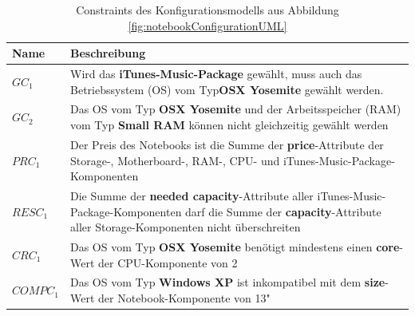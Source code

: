 \documentclass[12pt,a4paper,bibliography=totocnumbered,listof=totoc]{scrartcl}
\begin{document}
\begin{table}[]
\centering
\caption{Constraints des Konfigurationsmodells aus Abbildung \ref{fig:notebookConfigurationUML}}
\label{tab:notebookConfigurationConstraints}
\begin{tabularx}{\textwidth}{|l|X|}
\hline
{\bf Name} & {\bf Beschreibung}\\
\hline
$GC_1$ & Wird das \textbf{iTunes-Music-Package} gewählt, muss auch das Betriebssystem (OS) vom Typ\textbf{OSX Yosemite} gewählt werden. \\
\hline
$GC_2$ & Das OS vom Typ \textbf{OSX Yosemite} und der Arbeitsspeicher (RAM) vom Typ \textbf{Small RAM} können nicht gleichzeitig gewählt werden\\
\hline
$PRC_1$ & Der Preis des Notebooks ist die Summe der \textbf{price}-Attribute der Storage-, Motherboard-, RAM-, CPU- und iTunes-Music-Package-Komponenten\\
\hline
$RESC_1$ & Die Summe der \textbf{needed capacity}-Attribute aller iTunes-Music-Package-Komponenten darf die Summe der \textbf{capacity}-Attribute aller Storage-Komponenten nicht überschreiten\\
\hline
$CRC_1$ & Das OS vom Typ \textbf{OSX Yosemite} benötigt mindestens einen \textbf{core}-Wert der CPU-Komponente von 2\\
\hline
$COMPC_1$ & Das OS vom Typ \textbf{Windows XP} ist inkompatibel mit dem \textbf{size}-Wert der Notebook-Komponente von 13"\\
\hline
\end{tabularx}
\end{table}
\end{document}
